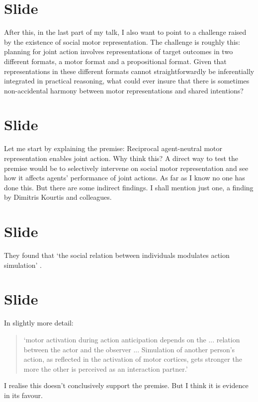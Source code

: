 \documentclass[12pt,\papersize]{extarticle}
\begin{document}
\section{Slide}
After this, in the last part of my talk, I also want to point to a challenge raised by the existence of social motor representation.  
The challenge is roughly this: planning for joint action involves representations of target outcomes in two different formats, a motor format and a propositional format.  
Given that representations in these different formats cannot straightforwardly be inferentially integrated in practical reasoning, what could ever insure that there is sometimes non-accidental harmony between motor representations and shared intentions?





\section{Slide}
Let me start by explaining the premise: Reciprocal agent-neutral motor representation enables joint action.
Why think this?
A direct way to test the premise would be to selectively intervene on social motor representation and see how it affects agents’ performance of joint actions.
As far as I know no one has done this.
But there are some indirect findings.
I shall mention just one, a finding by Dimitris Kourtis and colleagues.


\section{Slide}
They found that `the social relation between individuals modulates action simulation' \citep[p.\ 1]{kourtis:2010_favoritism}.  


\section{Slide}
In slightly more detail:
\begin{quote}
`motor activation during action anticipation depends on the ... relation between the actor and the observer ... Simulation of another person’s action, as reﬂected in the activation of motor cortices, gets stronger the more the other is perceived as an interaction partner.’  \citep[p.\ 4]{kourtis:2010_favoritism}
\end{quote}
I realise this doesn’t conclusively support the premise.  But I think it is evidence in its favour.
\end{document}
